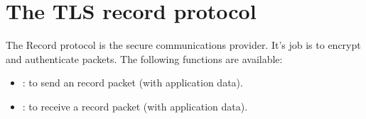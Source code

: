 \section{The TLS record protocol}

The Record protocol is the secure communications provider. It's job is
to encrypt and authenticate packets. 
The following functions are available:
\par
\begin{itemize}
\item {}:
to send an record packet (with application data).
\item {}:
to receive a record packet (with application data).
\end{itemize}



